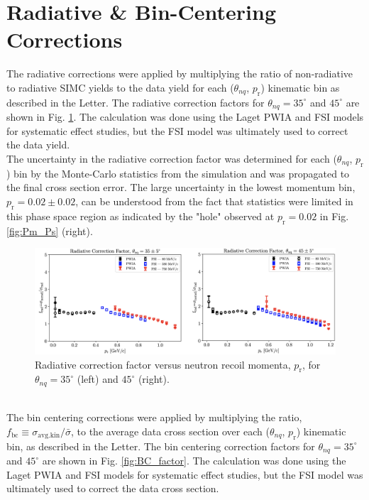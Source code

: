 \documentclass[aps, prl]{revtex4-2}  %
\begin{document}
\section{\large Radiative \& Bin-Centering Corrections}
\indent The radiative corrections were applied by multiplying the ratio of non-radiative to radiative SIMC yields to the data yield for each ($\theta_{nq}$, $p_{\mathrm{r}}$)
kinematic bin as described in the Letter. The radiative correction factors for $\theta_{nq}=35^{\circ}$ and $45^{\circ}$ are shown in Fig. \ref{fig:RC_factor}. The calculation was done using the
Laget PWIA and FSI models for systematic effect studies, but the FSI model was ultimately used to correct the data yield. \\
\indent The uncertainty in the radiative
correction factor was determined for each ($\theta_{nq}$, $p_{\mathrm{r}}$) bin by the Monte-Carlo statistics from the simulation and was propagated to the final cross section error.
The large uncertainty in the lowest momentum bin, $p_{\mathrm{r}} = 0.02\pm0.02$, can be understood from the fact that statistics were limited in this phase space region as indicated by
the "hole" observed at $p_{\mathrm{r}} = 0.02$ in Fig. \ref{fig:Pm_Ps} (right). 
\begin{figure}[!h]
\includegraphics[scale=0.27]{RC_factor.png}
\caption{Radiative correction factor versus neutron recoil momenta, $p_{\mathrm{r}}$, for $\theta_{nq}=35^{\circ}$ (left) and $45^{\circ}$ (right). }
\label{fig:RC_factor}
\end{figure}\\
The bin centering corrections were applied by multiplying the ratio, $f_{\mathrm{bc}} \equiv \sigma_{\mathrm{avg.kin}}/\bar{\sigma}$, to the average data cross section over each ($\theta_{nq}$, $p_{\mathrm{r}}$)
kinematic bin, as described in the Letter. The bin centering correction factors for $\theta_{nq}=35^{\circ}$ and $45^{\circ}$ are shown in
Fig. \ref{fig:BC_factor}. The calculation was done using the Laget PWIA and FSI models for systematic effect studies, but the FSI model was ultimately used to correct the data cross section. \\
\end{document}
